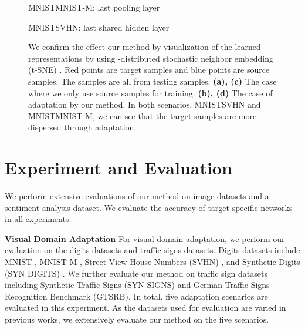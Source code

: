 \documentclass{article}
\begin{document}
 \newcommand\subcaption[1]{\begin{center}#1\end{center}}
\begin{figure*}[t]
\begin{minipage}{0.5\hsize}
\subcaption{MNISTMNIST-M: last pooling layer}
\centering
   \begin{subfigure}[Non-adapted]{\centering
   \texttt{[image: embed\_mnist2m\_cut.eps]} \label{fig:mnist2m_noad}}
    \end{subfigure}
 \centering
\begin{subfigure}[Adapted]{\centering
   \texttt{[image: embed\_mnist2m2\_cut.eps]}  \label{fig:mnist2m_ad}}
    \end{subfigure}
    \end{minipage}
    \begin{minipage}{0.5\hsize}
\subcaption{MNISTSVHN: last shared hidden layer}
  \centering
   \begin{subfigure}[Non-adapted]{\centering
   \texttt{[image: svhn\_noad\_cut.eps]}\label{fig:mnist2svhn_noad}}
    \end{subfigure}
      \begin{subfigure}[Adapted]{\centering
   \texttt{[image: svhn\_embed\_ad25\_cut.eps]}\label{fig:mnist2svhn_ad}}
    \end{subfigure}
    \end{minipage}
  \caption{We confirm the effect our method by visualization of the learned representations by using -distributed stochastic neighbor embedding (t-SNE) \cite{maaten2008visualizing}. Red points are target samples and blue points are source samples. The samples are all from testing samples. {\bf (a), (c)} The case where we only use source samples for training. {\bf (b), (d)} The case of adaptation by our method. In both scenarios, MNISTSVHN and MNISTMNIST-M, we can see that the target samples are more dispersed through adaptation.}
  \label{fig:embed_mnist}
\end{figure*}
\vspace{-2mm}
\section{Experiment and Evaluation}
We perform extensive evaluations of our method on image datasets and a sentiment analysis dataset. We evaluate the accuracy of target-specific networks in all experiments. 

\textbf{Visual Domain Adaptation}
For visual domain adaptation, we perform our evaluation on the digits datasets and traffic signs datasets. Digits datasets include MNIST \cite{lecun1998gradient}, MNIST-M \cite{ganin2014unsupervised}, Street View House Numbers (SVHN) \cite{netzer2011reading}, and Synthetic Digits (SYN DIGITS) \cite{ganin2014unsupervised}. We further evaluate our method on traffic sign datasets including Synthetic Traffic Signs (SYN SIGNS) \cite{moiseev2013evaluation} and German Traffic Signs Recognition Benchmark \cite{stallkamp2011german} (GTSRB). In total, five adaptation scenarios are evaluated in this experiment. As the datasets used for evaluation are varied in previous works, we extensively evaluate our method on the five scenarios.
\end{document}
